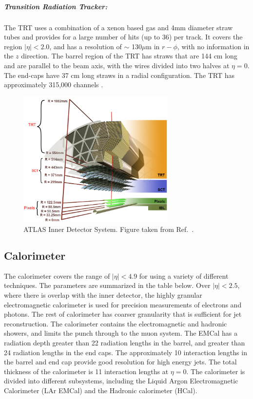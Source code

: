 \subparagraph{Transition Radiation Tracker:} The TRT uses a combination of a xenon based gas and 4mm diameter straw tubes and provides for a large number of hits (up to 36) per track.
It covers the region $|\eta| <  2.0$, and has a resolution of $\sim$ 130$\mu$m in $r-\phi$, with no information in the $z$ direction.
The barrel region of the TRT has straws that are 144 cm long and are parallel to the beam axis, with the wires divided into two halves at $\eta = 0$.
The end-caps have 37 cm long straws in a radial configuration.
The TRT has approximately 315,000 channels \cite{Aad:2008zzm}.


\begin{figure}[ht]
	\centering
        \includegraphics[width=0.7\textwidth]{figures/setup/inner_det.png}
          \caption{ATLAS Inner Detector System.
          Figure taken from Ref.~\cite{Potamianos:2209070}.}
          \label{fig:inner_det}
\end{figure}

\subsection{Calorimeter}
The calorimeter covers the range of $|\eta| < 4.9$ for using a variety of different techniques.
The parameters are summarized in the table below.
Over  $|\eta| < 2.5$, where there is overlap with the inner detector, the highly granular electromagnetic calorimeter is used for precision measurements of electrons and photons.
The rest of calorimeter has coarser granularity that is sufficient for jet reconstruction.
The calorimeter contains the electromagnetic and hadronic showers, and limits the punch through to the muon system.
The EMCal has a radiation depth greater than 22 radiation lengths in the barrel, and greater than 24 radiation lengths in the end caps.
The approximately 10 interaction lengths in the barrel and end cap provide good resolution for high energy jets.
The total thickness of the calorimeter is 11 interaction lengths at $\eta = 0$.
The calorimeter is divided into different subsystems, including the Liquid Argon Electromagnetic Calorimeter (LAr EMCal) and the Hadronic calorimeter (HCal).

